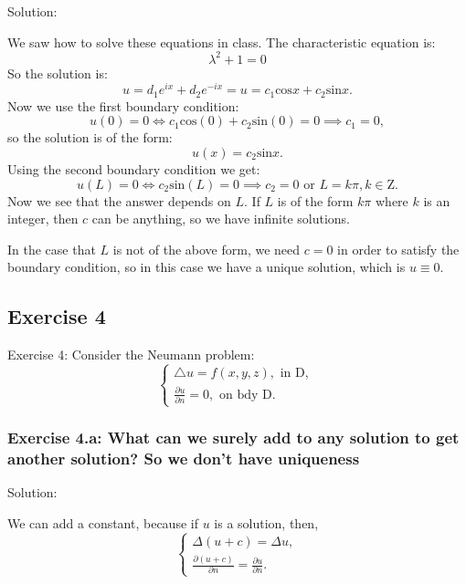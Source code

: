 \documentclass{article}
\begin{document}
		Solution:

		We saw how to solve these equations in class.
		The characteristic equation is:
		\[
			\lambda^2 +1=0
		\]
		So the solution is:
\[u = d_1e^{ix} + d_2e^{-ix} =u = c_1\text{cos}x +	c_2\text{sin}x.\]
		Now we use the first boundary condition:
		\[
			u(0)=0 \iff c_1\text{cos}(0) +
			c_2\text{sin}(0) = 0 \implies c_1=0,
	        \]
		so the solution is of the form:
		\[
			u(x)=c_{2}\text{sin}x.
		\]
		Using the second boundary condition we get:
		\[
			u(L)=0 \iff c_{2}\text{sin}(L) =0 \implies c_{2}=0 \text{ or } L=k\pi, k\in \mathrm{Z}.
		\]
		Now we see that the answer depends on $L$. If $L$ is of the form $k\pi$ where $k$ is an integer, then $c$ can be anything, so we have infinite solutions.

		In the case that $L$ is not of the above form, we need $c=0$
		in order to satisfy the boundary condition, so in
		this case we have a unique solution, which is $u
		\equiv 0$.
		
		\subsection{Exercise 4}
		Exercise 4: Consider the Neumann problem:
		\begin{equation*}
			\begin{cases}
				\triangle u = f(x,y,z), \text{ in D, }
				\\
				\frac{\partial u}{\partial n}=0, \text{ on bdy D. }
			\end{cases}
		\end{equation*}
	
		\subsubsection{Exercise 4.a: What can we surely add to any
		solution to get another solution? So we
	don't have uniqueness}

		Solution:

		We can add a constant, because if $u$ is a solution,
		then,
		\begin{equation*}
			\begin{cases}
			\Delta(u+c)= \Delta u,
             \\
			 \frac{\partial(u+c)}{\partial n}=\frac{\partial u}{\partial n}.
			\end{cases}
		\end{equation*}
		
\end{document}
